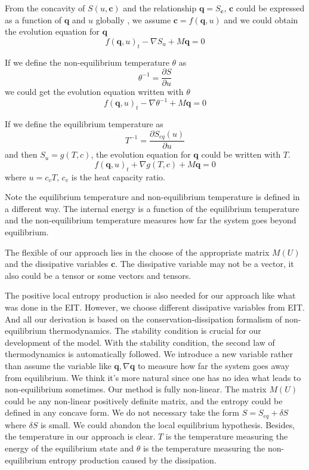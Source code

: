 \documentclass[a4paper]{article}
\begin{document}
From the concavity of $S(u,\mathbf{c})$ and the relationship $\mathbf{q}=S_\mathbf{c}$, $\mathbf{c}$ could be expressed as a function of $\mathbf{q}$ and $u$ globally \cite{friedrichs1971systems}, we assume $\mathbf{c}=f(\mathbf{q},u)$ and we could obtain the evolution equation for $\mathbf{q}$
\begin{equation}
f(\mathbf{q},u)_t-\nabla S_u + M \mathbf{q} = 0
\end{equation}

If we define the non-equilibrium temperature $\theta$ as
\begin{equation}
\theta^{-1}=\frac{\partial S}{\partial u}
\end{equation}
we could get the evolution equation written with $\theta$
\begin{equation}
f(\mathbf{q},u)_t-\nabla \theta^{-1} + M \mathbf{q} = 0
\end{equation}

If we define the equilibrium temperature as
\begin{equation}
T^{-1} = \frac{\partial S_{eq}(u)}{\partial u}
\end{equation}
and then $S_u = g(T,c)$, the evolution equation for $\mathbf{q}$ could be written with $T$.
\begin{equation}
f(\mathbf{q},u)_t + \nabla g(T,c) + M \mathbf{q} = 0
\end{equation}
where $u=c_v T$, $c_v$ is the heat capacity ratio.

Note the equilibrium temperature and non-equilibrium temperature is defined in a different way. The internal energy is a function of the equilibrium temperature and the non-equilibrium temperature measures how far the system goes beyond equilibrium.

The flexible of our approach lies in the choose of the appropriate matrix $M(U)$ and the dissipative variables $\mathbf{c}$. The dissipative variable may not be a vector, it also could be a tensor or some vectors and tensors. 

The positive local entropy production is also needed for our approach like what was done in the EIT. However, we choose different dissipative variables from EIT. And all our derivation is based on the conservation-dissipation formalism of non-equilibrium thermodynamics. The stability condition is crucial for our development of the model. With the stability condition, the second law of thermodynamics is automatically followed. We introduce a new variable rather than assume the variable like $\mathbf{q},\nabla \mathbf{q}$ to measure how far the system goes away from equilibrium. We think it's more natural  since one has no idea what leads to non-equilibrium sometimes. Our method is fully non-linear. The matrix $M(U)$ could be any non-linear positively definite matrix, and the entropy could be defined in any concave form. We do not necessary take the form $S=S_{eq}+\delta S$ where $\delta S$ is small. We could abandon the local equilibrium hypothesis. Besides, the temperature in our approach is clear. $T$ is the temperature measuring the energy of the equilibrium state and $\theta$ is the temperature measuring the non-equilibrium entropy production caused by the dissipation.  
\end{document}
